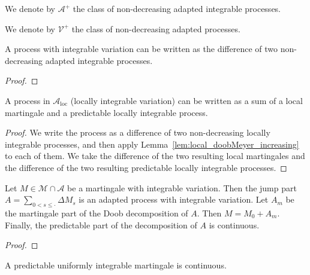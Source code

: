 We denote by $\mathcal{A}^+$ the class of non-decreasing adapted integrable processes.

We denote by $\mathcal{V}^+$ the class of non-decreasing adapted processes.


\begin{lemma}\label{lem:HasIntegrableVariation.eq_sub_monotone}
A process with integrable variation can be written as the difference of two non-decreasing adapted integrable processes.
\end{lemma}

\begin{proof}

\end{proof}


\begin{lemma}\label{lem:local_doobMeyer_integrable_variation}
A process in $\mathcal{A}_{\mathrm{loc}}$ (locally integrable variation) can be written as a sum of a local martingale and a predictable locally integrable process.
\end{lemma}

\begin{proof}
We write the process as a difference of two non-decreasing locally integrable processes, and then apply Lemma~\ref{lem:local_doobMeyer_increasing} to each of them.
We take the difference of the two resulting local martingales and the difference of the two resulting predictable locally integrable processes.
\end{proof}


\begin{lemma}\label{lem:martingalePart_jumpPart}
Let $M \in \mathcal{M} \cap \mathcal{A}$ be a martingale with integrable variation. Then the jump part $A = \sum_{0 < s \le \cdot} \Delta M_s$ is an adapted process with integrable variation. Let $A_m$ be the martingale part of the Doob decomposition of $A$. Then $M = M_0 + A_m$. Finally, the predictable part of the decomposition of $A$ is continuous.
\end{lemma}

\begin{proof}

\end{proof}


\begin{lemma}\label{lem:Martingale.continuous_of_isStronglyPredictable_of_uniformIntegrable}
A predictable uniformly integrable martingale is continuous.
\end{lemma}

